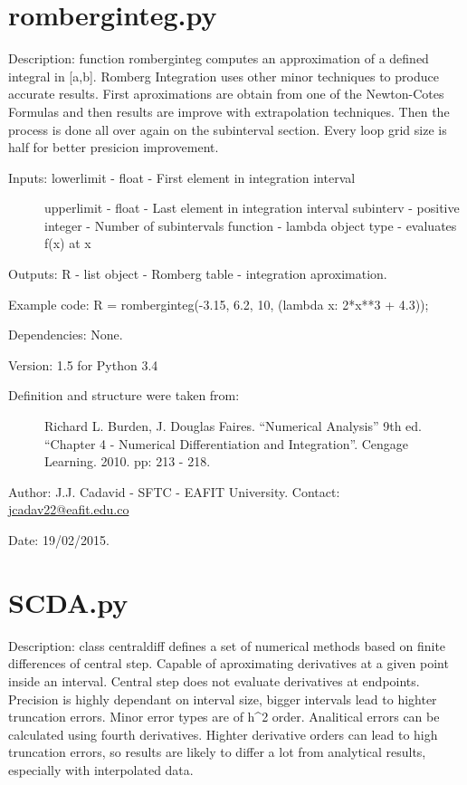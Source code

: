 \documentclass[letterpaper,10pt,oneside]{sphinxmanual}
\theoremstyle{plain}%
\theoremstyle{definition}%
\theoremstyle{remark}%
\begin{document}
\section{romberginteg.py}
\label{code:module-romberginteg}\label{code:romberginteg-py}
Description: function romberginteg computes an approximation of a defined
integral in {[}a,b{]}. Romberg Integration uses other minor techniques to produce
accurate results. First aproximations are obtain from one of the Newton-Cotes
Formulas and then results are improve with extrapolation techniques. Then
the process is done all over again on the subinterval section. Every loop
grid size is half for better presicion improvement.
\begin{description}
\item[{Inputs: lowerlimit - float - First element in integration interval}] \leavevmode
upperlimit - float - Last element in integration interval
subinterv - positive integer - Number of subintervals
function - lambda object type - evaluates f(x) at x

\end{description}

Outputs: R - list object - Romberg table - integration aproximation.

Example code: R = romberginteg(-3.15, 6.2, 10, (lambda x: 2*x**3 + 4.3));

Dependencies: None.

Version: 1.5 for Python 3.4
\begin{description}
\item[{Definition and structure were taken from:}] \leavevmode
Richard L. Burden, J. Douglas Faires. ``Numerical Analysis'' 9th ed.
``Chapter 4 - Numerical Differentiation and Integration''. 
Cengage Learning. 2010. pp: 213 - 218.

\end{description}

Author: J.J. Cadavid - SFTC - EAFIT University.
Contact: \href{mailto:jcadav22@eafit.edu.co}{jcadav22@eafit.edu.co}

Date: 19/02/2015.


\section{SCDA.py}
\label{code:scda-py}\label{code:module-SCDA}
Description: class centraldiff defines a set of numerical methods based on
finite differences of central step. Capable of aproximating derivatives at
a given point inside an interval. Central step does not evaluate derivatives
at endpoints. Precision is highly dependant on interval size, bigger intervals
lead to highter truncation errors. Minor error types are of h\textasciicircum{}2 order.
Analitical errors can be calculated using fourth derivatives. Highter
derivative orders can lead to high truncation errors, so results are likely
to differ a lot from analytical results, especially with interpolated data.
\end{document}
